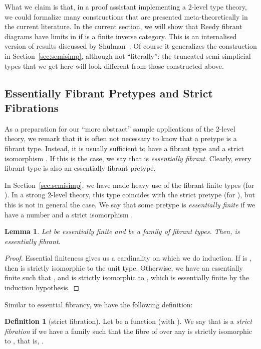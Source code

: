 \documentclass[a4paper,reqno]{amsart}
\theoremstyle{plain}
\newtheorem{lemma}[theorem]{Lemma}
\theoremstyle{definition}
\newtheorem{definition}[theorem]{Definition}
\begin{document}
What we claim is that, in a proof assistant implementing a 2-level type theory, we could formalize many constructions that are presented meta-theoretically in the current literature.
In the current section, we will show that Reedy fibrant diagrams  have limits in  if  is a finite inverse category. This is an internalised version of results discussed by Shulman~\cite{shulman_inversediagrams}.
Of course it generalizes the construction in Section~\ref{sec:semisimp}, although not ``literally'': the truncated semi-simplicial types that we get here will look different from those constructed above.

\subsection{Essentially Fibrant Pretypes and Strict Fibrations}

As a preparation for our ``more abstract'' sample applications of the 2-level theory, we remark that it is often not necessary to know that a pretype  is a fibrant type. 
Instead, it is usually sufficient to have a fibrant type  and a strict isomorphism . 
If this is the case, we say that  is \emph{essentially fibrant}. Clearly, every fibrant type is also an essentially fibrant pretype.

In Section~\ref{sec:semisimp}, we have made heavy use of the fibrant finite types  (for ).
In a strong 2-level theory, this type coincides with the strict pretype  (for ), but this is not in general the case.
We say that some pretype  is \emph{essentially finite} if we have a number  and a strict isomorphism .
\begin{lemma}
 Let  be essentially finite and  be a family of fibrant types. Then,  is essentially fibrant.
\end{lemma}
\begin{proof}
 Essential finiteness gives us a cardinality  on which we do induction. If  is , then  is strictly isomorphic to the unit type. 
 Otherwise, we have an essentially finite  such that , and  is strictly isomorphic to
,
 which is essentially finite by the induction hypothesis.
\end{proof}


Similar to essential fibrancy, we have the following definition:

\begin{definition}[strict fibration]
Let  be a function (with ).  
We say that  is a \emph{strict fibration} if we have a family  such that
the fibre of  over any  is strictly isomorphic to , that is,
. 
\end{definition}
\end{document}
